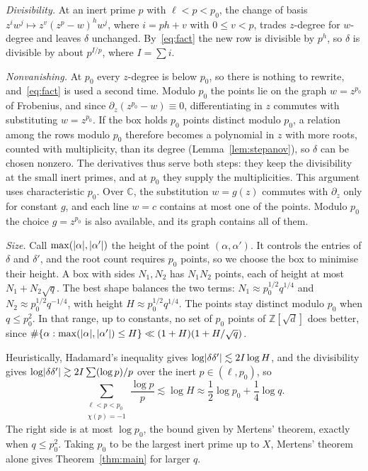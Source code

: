 \documentclass[11pt]{amsart}
\theoremstyle{remark}
\newcommand{\Z}{\mathbb{Z}}
\newcommand{\sd}{\sqrt{d}}
\newcommand{\C}{\mathbb{C}}
\DeclarePairedDelimiter\abs{\lvert}{\rvert}
\begin{document}
\emph{Divisibility.} At an inert prime $p$ with $\ell<p<p_0$, the change of basis
$z^iw^j\mapsto z^v(z^p-w)^hw^j$, where $i=ph+v$ with $0\le v<p$, trades $z$-degree for $w$-degree and leaves $\delta$
unchanged. By~\eqref{eq:fact} the new row is divisible by $p^h$, so $\delta$ is divisible by
about $p^{I/p}$, where $I=\sum i$.

\emph{Nonvanishing.} At $p_0$ every $z$-degree is below $p_0$, so there is nothing to rewrite,
and~\eqref{eq:fact} is used a second time. Modulo $p_0$ the points lie on the graph $w=z^{p_0}$ of
Frobenius, and since $\partial_z(z^{p_0}-w)\equiv0$, differentiating in $z$ commutes with substituting
$w=z^{p_0}$. If the box holds $p_0$ points distinct modulo $p_0$, a relation among the rows modulo $p_0$ therefore
becomes a polynomial in $z$ with more roots,
counted with multiplicity, than its degree (Lemma~\ref{lem:stepanov}), so $\delta$ can be chosen nonzero.
The derivatives thus serve both steps: they keep the divisibility at the small inert primes, and at $p_0$ they
supply the multiplicities. This argument uses characteristic $p_0$. Over $\C$, the
substitution $w=g(z)$ commutes with $\partial_z$ only for constant $g$, and each line $w=c$ contains at
most one of the points. Modulo $p_0$ the choice $g=z^{p_0}$ is also available, and its graph contains
all of them.

\emph{Size.} Call $\max(\abs{\alpha},\abs{\alpha'})$ the height of the point $(\alpha,\alpha')$. It
controls the entries of $\delta$ and $\delta'$, and the root count requires $p_0$ points, so we choose the
box to minimise their height. A box with sides $N_1,N_2$ has $N_1N_2$ points, each of height at most
$N_1+N_2\sqrt q$. The best shape balances the two terms: $N_1\approx p_0^{1/2}q^{1/4}$ and
$N_2\approx p_0^{1/2}q^{-1/4}$, with height $H\approx p_0^{1/2}q^{1/4}$. The points stay distinct modulo
$p_0$ when $q\le p_0^2$. In that range,
up to constants, no set of $p_0$ points of $\Z[\sd]$ does better, since
$\#\{\alpha:\max(\abs{\alpha},\abs{\alpha'})\le H\}\ll(1+H)(1+H/\sqrt q)$.

Heuristically, Hadamard's inequality gives $\log\abs{\delta\delta'}\lesssim2I\log H$, and the
divisibility gives $\log\abs{\delta\delta'}\gtrsim2I\sum(\log p)/p$ over the inert $p\in(\ell,p_0)$, so
\[
\sum_{\substack{\ell<p<p_0\\ \chi(p)=-1}}\frac{\log p}p\lesssim\log H\approx\frac12\log p_0+\frac14\log q.
\]
The right side is at most $\log p_0$, the bound given by Mertens' theorem, exactly when $q\le p_0^2$.
Taking $p_0$ to be the largest inert prime up to $X$, Mertens' theorem alone gives Theorem~\ref{thm:main} for larger $q$.
\end{document}
